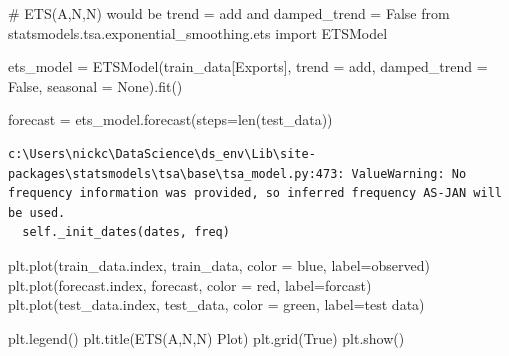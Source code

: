 \documentclass[
  11pt,
]{article}
\newenvironment{Shaded}{\begin{snugshade}}{\end{snugshade}}
\newcommand{\BuiltInTok}[1]{\textcolor[rgb]{0.00,0.23,0.31}{#1}}
\newcommand{\CommentTok}[1]{\textcolor[rgb]{0.37,0.37,0.37}{#1}}
\newcommand{\ImportTok}[1]{\textcolor[rgb]{0.00,0.46,0.62}{#1}}
\newcommand{\NormalTok}[1]{\textcolor[rgb]{0.00,0.23,0.31}{#1}}
\newcommand{\OperatorTok}[1]{\textcolor[rgb]{0.37,0.37,0.37}{#1}}
\newcommand{\StringTok}[1]{\textcolor[rgb]{0.13,0.47,0.30}{#1}}
\newcommand{\VariableTok}[1]{\textcolor[rgb]{0.07,0.07,0.07}{#1}}
\begin{document}
\begin{Shaded}
\begin{Highlighting}[]
\CommentTok{\# ETS(A,N,N) would be trend = \textquotesingle{}add\textquotesingle{} and damped\_trend = False}
\ImportTok{from}\NormalTok{ statsmodels.tsa.exponential\_smoothing.ets }\ImportTok{import}\NormalTok{ ETSModel}

\NormalTok{ets\_model }\OperatorTok{=}\NormalTok{ ETSModel(train\_data[}\StringTok{\textquotesingle{}Exports\textquotesingle{}}\NormalTok{], trend }\OperatorTok{=} \StringTok{\textquotesingle{}add\textquotesingle{}}\NormalTok{, damped\_trend }\OperatorTok{=} \VariableTok{False}\NormalTok{, seasonal }\OperatorTok{=} \VariableTok{None}\NormalTok{).fit()}

\NormalTok{forecast }\OperatorTok{=}\NormalTok{ ets\_model.forecast(steps}\OperatorTok{=}\BuiltInTok{len}\NormalTok{(test\_data))}
\end{Highlighting}
\end{Shaded}

\begin{verbatim}
c:\Users\nickc\DataScience\ds_env\Lib\site-packages\statsmodels\tsa\base\tsa_model.py:473: ValueWarning: No frequency information was provided, so inferred frequency AS-JAN will be used.
  self._init_dates(dates, freq)
\end{verbatim}

\begin{Shaded}
\begin{Highlighting}[]

\NormalTok{plt.plot(train\_data.index, train\_data, color }\OperatorTok{=} \StringTok{\textquotesingle{}blue\textquotesingle{}}\NormalTok{, label}\OperatorTok{=}\StringTok{\textquotesingle{}observed\textquotesingle{}}\NormalTok{)}
\NormalTok{plt.plot(forecast.index, forecast, color }\OperatorTok{=} \StringTok{\textquotesingle{}red\textquotesingle{}}\NormalTok{, label}\OperatorTok{=}\StringTok{\textquotesingle{}forcast\textquotesingle{}}\NormalTok{)}
\NormalTok{plt.plot(test\_data.index, test\_data, color }\OperatorTok{=} \StringTok{\textquotesingle{}green\textquotesingle{}}\NormalTok{, label}\OperatorTok{=}\StringTok{\textquotesingle{}test data\textquotesingle{}}\NormalTok{)}


\NormalTok{plt.legend()}
\NormalTok{plt.title(}\StringTok{\textquotesingle{}ETS(A,N,N) Plot\textquotesingle{}}\NormalTok{)}
\NormalTok{plt.grid(}\VariableTok{True}\NormalTok{)}
\NormalTok{plt.show()}
\end{Highlighting}
\end{Shaded}
\end{document}
